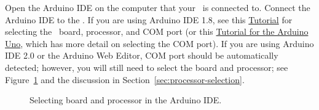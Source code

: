 Open the Arduino IDE on the computer that your \nano\ is connected to. Connect
the Arduino IDE to the \nano. If you are using Arduino IDE 1.8, see this
\href{https://www.arduino.cc/en/Guide/ArduinoNano#select-your-board-type-and-port}{Tutorial}
for selecting the \nano\ board, processor, and COM port (or this
\href{https://www.arduino.cc/en/Guide/ArduinoUno#select-your-board-type-and-port}{Tutorial
for the Arduino Uno}, which has more detail on selecting the COM port). If you
are using Arduino IDE 2.0 or the Arduino Web Editor, COM port should be
automatically detected; however, you will still need to select the board and
processor; see Figure~\ref{fig:selecting-nano} and the discussion in
Section~\ref{sec:processor-selection}.

\begin{figure}
    \centering
    \hfil

    \caption{Selecting board and processor in the Arduino IDE.
        \label{fig:selecting-nano}}
\end{figure}

